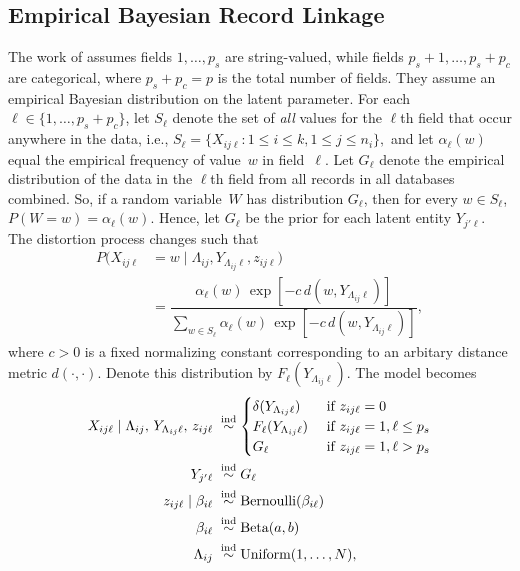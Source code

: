 \documentclass[twoside]{article}
\begin{document}
\subsection{Empirical Bayesian Record Linkage}
\label{sec:string}
The work of \cite{steorts15entity} 
assumes  fields $1,\ldots,p_s$ are string-valued, while fields $p_s+1,\ldots,p_s+p_c$ are categorical, where $p_s+p_c=p$ is the total number of fields. They assume an empirical Bayesian distribution on the latent parameter. For each $\ell\in\{1,\ldots,p_s+p_c\}$, let $S_\ell$ denote the set of \emph{all} values for the $\ell$th field
that occur anywhere in the data, i.e.,
$S_\ell=\{X_{ij\ell}:1\le i\le k, 1\le j\le n_i\},$
and let $\alpha_\ell(w)$ equal the empirical frequency of value~$w$ in field~$\ell.$
%
Let $G_\ell$ denote the empirical distribution of the data in the $\ell$th field from all records in all databases combined.  So, if a random variable~$W$ has distribution $G_\ell$, then for every $w\in S_\ell$,
$P(W=w)=\alpha_\ell(w)$.
Hence, let $G_\ell$  be the prior for each latent entity $Y_{j'\ell}$. 
%
The distortion process changes such that
\begin{align*}
P(X_{ij\ell}&=w\mid\Lambda_{ij},Y_{\Lambda_{ij}\ell},z_{ij\ell}) \\
&=\dfrac{\alpha_\ell(w)\,\exp[-c\,d(w,Y_{\Lambda_{ij}\ell})]}{\sum_{w\in S_\ell}\alpha_\ell(w)\,\exp[-c\,d(w,Y_{\Lambda_{ij}\ell})]},
\end{align*}
where $c > 0$ is a fixed normalizing constant corresponding to an arbitary distance metric $d(\cdot,\cdot)$.  Denote this distribution by $F_\ell(Y_{\Lambda_{ij}\ell})$.
The model becomes
\begin{align}
\label{model:string}
X_{ij\ell}\mid \Lambda_{ij},\,Y_{\Lambda_{ij}\ell},\,z_{ij\ell}\;&\stackrel{\text{ind}}{\sim}\begin{cases}\delta(Y_{\Lambda_{ij}\ell})&\text{ if }z_{ij\ell}=0\\F_\ell(Y_{\Lambda_{ij}\ell})&\text{ if }z_{ij\ell}=1, \ell\le p_s\\G_\ell&\text{ if }z_{ij\ell}=1, \ell>p_s\end{cases} \notag \\
Y_{j'\ell}\;&\stackrel{\text{ind}}{\sim}G_\ell \notag \\
z_{ij\ell}\mid\beta_{i\ell}\;&\stackrel{\text{ind}}{\sim}\text{Bernoulli}(\beta_{i\ell}) \notag\\
\beta_{i\ell}\;&\stackrel{\text{ind}}{\sim}\text{Beta}(a,b) \notag \\ 
\Lambda_{ij}\;&\stackrel{\text{ind}}{\sim}\text{Uniform}\left(1,\ldots,N\right),
\end{align}
\end{document}
